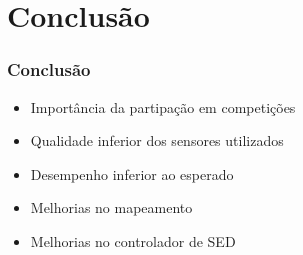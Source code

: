\section{Conclusão}


\begin{frame}
\frametitle{Conclusão}

\begin{itemize}
	\item Importância da partipação em competições
	\item Qualidade inferior dos sensores utilizados
	\item Desempenho inferior ao esperado
	\item Melhorias no mapeamento
	\item Melhorias no controlador de SED
\end{itemize}

\end{frame}

